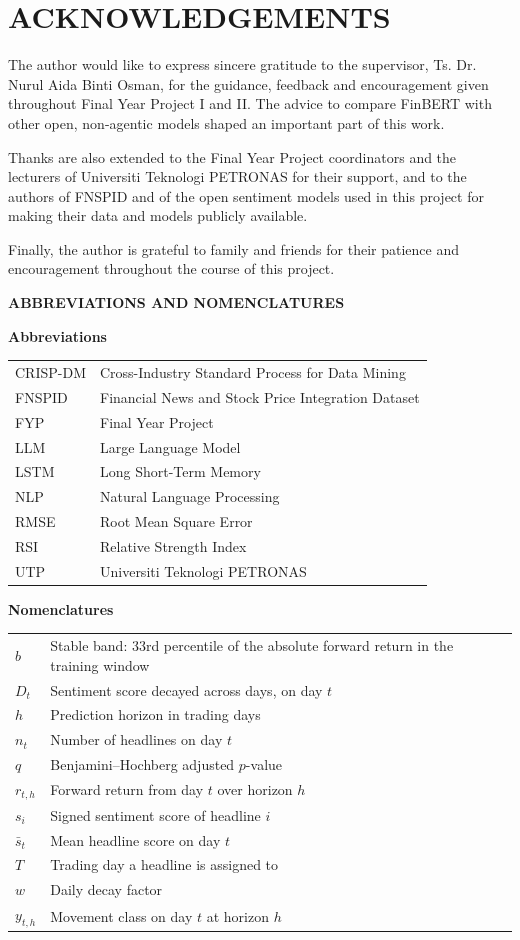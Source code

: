 \documentclass[a4paper,12pt,oneside]{report}
\newcommand{\UTPPrelimChapter}[1]{%
  \clearpage
  \phantomsection
  \addcontentsline{toc}{chapter}{#1}
  \chapter*{#1}
}
\newcommand{\UTPListHeading}[1]{%
  \vspace*{11mm}%
  {\noindent\normalfont\bfseries\fontsize{12pt}{14pt}\selectfont #1\par}%
  \vspace{12pt}%
}
\newcommand{\UTPListSubheading}[1]{%
  {\noindent\normalfont\bfseries\fontsize{12pt}{14pt}\selectfont #1\par}%
  \vspace{6pt}%
}
\newcommand{\AbbrevEntry}[2]{#1 & \raggedright\arraybackslash #2 \\[2pt]}
\begin{document}
\UTPPrelimChapter{ACKNOWLEDGEMENTS}
The author would like to express sincere gratitude to the supervisor, Ts. Dr. Nurul Aida Binti Osman, for the guidance, feedback and encouragement given throughout Final Year Project I and II. The advice to compare FinBERT with other open, non-agentic models shaped an important part of this work.

Thanks are also extended to the Final Year Project coordinators and the lecturers of Universiti Teknologi PETRONAS for their support, and to the authors of FNSPID and of the open sentiment models used in this project for making their data and models publicly available.

Finally, the author is grateful to family and friends for their patience and encouragement throughout the course of this project.

\clearpage
\tableofcontents

\clearpage
{}
{}
\listoffigures

\clearpage
{}
{}
\listoftables

\clearpage
{}
{}
\UTPListHeading{ABBREVIATIONS AND NOMENCLATURES}


\UTPListSubheading{Abbreviations}
\begin{longtable}{@{}p{3.6cm}p{10.4cm}@{}}
\AbbrevEntry{CRISP-DM}{Cross-Industry Standard Process for Data Mining}
\AbbrevEntry{FNSPID}{Financial News and Stock Price Integration Dataset}
\AbbrevEntry{FYP}{Final Year Project}
\AbbrevEntry{LLM}{Large Language Model}
\AbbrevEntry{LSTM}{Long Short-Term Memory}
\AbbrevEntry{NLP}{Natural Language Processing}
\AbbrevEntry{RMSE}{Root Mean Square Error}
\AbbrevEntry{RSI}{Relative Strength Index}
\AbbrevEntry{UTP}{Universiti Teknologi PETRONAS}
\end{longtable}

\UTPListSubheading{Nomenclatures}
\begin{longtable}{@{}p{3.6cm}p{10.4cm}@{}}
\AbbrevEntry{$b$}{Stable band: 33rd percentile of the absolute forward return in the training window}
\AbbrevEntry{$D_t$}{Sentiment score decayed across days, on day $t$}
\AbbrevEntry{$h$}{Prediction horizon in trading days}
\AbbrevEntry{$n_t$}{Number of headlines on day $t$}
\AbbrevEntry{$q$}{Benjamini--Hochberg adjusted $p$-value}
\AbbrevEntry{$r_{t,h}$}{Forward return from day $t$ over horizon $h$}
\AbbrevEntry{$s_i$}{Signed sentiment score of headline $i$}
\AbbrevEntry{$\bar{s}_t$}{Mean headline score on day $t$}
\AbbrevEntry{$T$}{Trading day a headline is assigned to}
\AbbrevEntry{$w$}{Daily decay factor}
\AbbrevEntry{$y_{t,h}$}{Movement class on day $t$ at horizon $h$}
\end{longtable}
\end{document}
